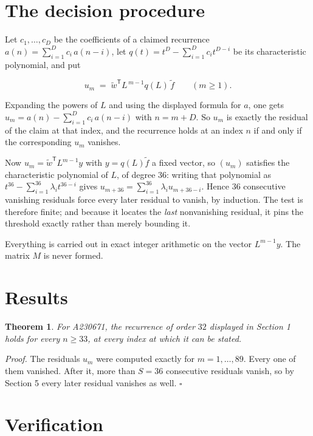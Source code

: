 \documentclass[11pt]{article}
\newtheorem{theorem}{Theorem}
\theoremstyle{definition}
\begin{document}
\section{The decision procedure}

Let $c_1,\dots,c_D$ be the coefficients of a claimed recurrence $a(n) = \sum_{i=1}^{D} c_i\,a(n-i)$, let $q(t) = t^{D} - \sum_{i=1}^{D} c_i t^{D-i}$ be its characteristic polynomial, and put

\[u_m \;=\; \tilde w^{\mathsf T} L^{\,m-1} q(L)\,\tilde f \qquad (m \ge 1).\]

Expanding the powers of $L$ and using the displayed formula for $a$, one gets $u_m = a(n) - \sum_{i=1}^{D} c_i\,a(n-i)$ with $n = m + D$. So $u_m$ is exactly the residual of the claim at that index, and the recurrence holds at an index $n$ if and only if the corresponding $u_m$ vanishes.

Now $u_m = \tilde w^{\mathsf T} L^{m-1} y$ with $y = q(L)\tilde f$ a fixed vector, so $(u_m)$ satisfies the characteristic polynomial of $L$, of degree $36$: writing that polynomial as $t^{36} - \sum_{i=1}^{36} \lambda_i t^{36-i}$ gives $u_{m+36} = \sum_{i=1}^{36} \lambda_i u_{m+36-i}$. Hence $36$ consecutive vanishing residuals force every later residual to vanish, by induction. The test is therefore finite; and because it locates the {\itshape last} nonvanishing residual, it pins the threshold exactly rather than merely bounding it.

Everything is carried out in exact integer arithmetic on the vector $L^{m-1}y$. The matrix $M$ is never formed.

\section{Results}

\begin{theorem} For A230671, the recurrence of order $32$ displayed in Section 1 holds for every $n \ge 33$, at every index at which it can be stated.\end{theorem}

{\itshape Proof.} The residuals $u_m$ were computed exactly for $m = 1,\dots,89$. Every one of them vanished. After it, more than $S = 36$ consecutive residuals vanish, so by Section 5 every later residual vanishes as well. $\square$

\section{Verification}
\end{document}
